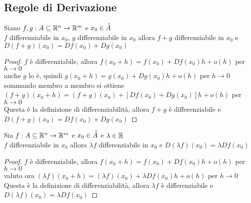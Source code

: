 \subsection{Regole di Derivazione}\label{sect:regole_deriv}
\proposition
\label{prop:diff_somma_diff}
Siano $f,g: A\subseteq \mathbb{R}^n \rightarrow \mathbb{R}^m$ e $x_0\in\accentset{\circ}{A}$\\
$f$ differenziabile in $x_0$, $g$ differenziabile in $x_0$ allora $f+g$ differenziabile in $x_0$ e $D(f+g)(x_0) = Df(x_0)+Dg(x_0)$
\begin{proof}
	$f$ è differenziabile, allora $f(x_0+h)=f(x_0)+Df(x_0)h+o(h)$ per $h\rightarrow 0$\\
	anche $g$ lo è, quindi $g(x_0+h)=g(x_0)+Dg(x_0)h+o(h)$ per $h\rightarrow 0$\\
	sommando membro a membro si ottiene  $(f+g)(x_0+h)=(f+g)(x_0)+[Df(x_0)+Dg(x_0)]h+o(h)$ per $h\rightarrow 0$\\
	Questa è la definizione di differenziabilità, allora $f+g$ è differenziabile e $D(f+g)(x_0) = Df(x_0)+Dg(x_0)$
\end{proof}

\proposition
Sia $f: A\subseteq \mathbb{R}^n \rightarrow \mathbb{R}^m$ e $x_0\in\accentset{\circ}{A}$ e $\lambda\in \mathbb{R}$\\
$f$ differenziabile in $x_0$ allora $\lambda f$ differenziabile in $x_0$ e $D(\lambda f)(x_0) = \lambda Df(x_0)$
\begin{proof}
	$f$ è differenziabile, allora $f(x_0+h)=f(x_0)+Df(x_0)h+o(h)$ per $h\rightarrow 0$\\
	valuto ora $(\lambda f)(x_0+h)=(\lambda f)(x_0)+\lambda Df(x_0)h+o(h)$ per $h\rightarrow 0$\\
	Questa è la definizione di differenziabilità, allora $\lambda f$ è differenziabile e $D(\lambda f)(x_0) = \lambda Df(x_0)$
\end{proof}

